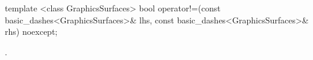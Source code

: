 \pnum
\begin{itemdecl}
template <class GraphicsSurfaces>
bool operator!=(const basic_dashes<GraphicsSurfaces>& lhs,
  const basic_dashes<GraphicsSurfaces>& rhs) noexcept;
\end{itemdecl}
\begin{itemdescr}
\pnum
\returns
{}.
\end{itemdescr}
